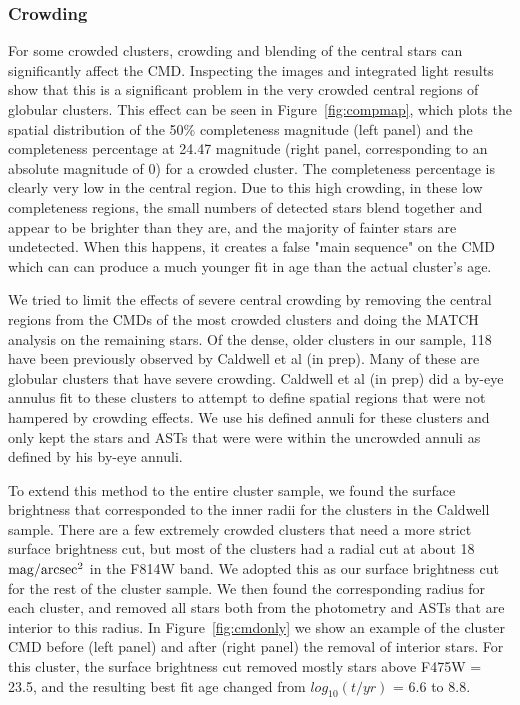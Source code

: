 \documentclass{emulateapj}
\begin{document}
\subsubsection{Crowding}\label{sec:crowding}

For some crowded clusters, crowding and blending of the central stars can significantly affect the CMD.  Inspecting the images and integrated light results show that this is a significant problem in the very crowded central regions of globular clusters.  This effect can be seen in Figure~\ref{fig:compmap}, which plots the spatial distribution of the 50\% completeness magnitude (left panel) and the completeness percentage at 24.47 magnitude (right panel, corresponding to an absolute magnitude of 0) for a crowded cluster.  The completeness percentage is clearly very low in the central region.  Due to this high crowding, in these low completeness regions, the small numbers of detected stars blend together and appear to be brighter than they are, and the majority of fainter stars are undetected.  When this happens, it creates a false "main sequence" on the CMD which can can produce a much younger fit in age than the actual cluster's age.  

We tried to limit the effects of severe central crowding by removing the central regions from the CMDs of the most crowded clusters and doing the MATCH analysis on the remaining stars.  Of the dense, older clusters in our sample, 118 have been previously observed by Caldwell et al (in prep).  Many of these are globular clusters that have severe crowding.  Caldwell et al (in prep) did a by-eye annulus fit to these clusters to attempt to define spatial regions that were not hampered by crowding effects.  We use his defined annuli for these clusters and only kept the stars  and ASTs that were were within the uncrowded annuli as defined by his by-eye annuli.

To extend this method to the entire cluster sample, we found the surface brightness that corresponded to the inner radii for the clusters in the Caldwell sample.  There are a few extremely crowded clusters that need a more strict surface brightness cut, but most of the clusters had a radial cut at about 18 ${\rm mag/arcsec^2}$ in the F814W band.  We adopted this as our surface brightness cut for the rest of the cluster sample.  We then found the corresponding radius for each cluster, and removed all stars both from the photometry and ASTs that are interior to this radius.  In Figure~\ref{fig:cmdonly} we show an example of the cluster CMD before (left panel) and after (right panel) the removal of interior stars.  For this cluster, the surface brightness cut removed mostly stars above F475W = 23.5, and the resulting best fit age changed from $log_{10} (t/yr)$ = 6.6 to 8.8.  
\end{document}
